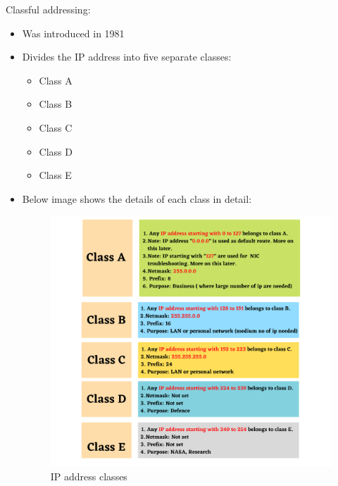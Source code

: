 \setlength{\columnsep}{3pt}
\begin{flushleft}
Classful addressing:
\begin{itemize}
		\item Was introduced in 1981
		\item Divides the IP address into five separate classes:
		\begin{itemize}
			\item Class A
			\item Class B
			\item Class C
			\item Class D
			\item Class E
		\end{itemize}
		\item Below image shows the details of each class in detail:
		\begin{figure}[h!]
			\centering
			\includegraphics[scale=.3]{content/chapter14/images/ip_classes.png}
			\caption{IP address classes}
			\label{fig:type}
		\end{figure}	
\end{itemize}

\newpage

\end{flushleft}
